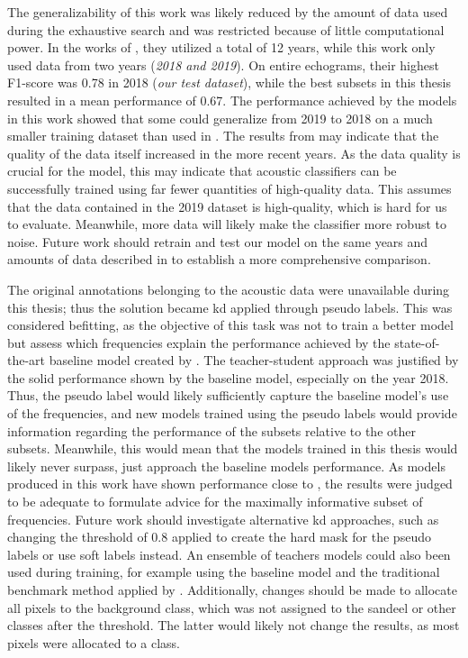     The generalizability of this work was likely reduced by the amount of data used during the exhaustive search and was restricted because of little computational power. In the works of \citeauthor{brautaset2020acoustic}, they utilized a total of 12 years, while this work only used data from two years (\textit{2018 and 2019}). On entire echograms, their highest F1-score was 0.78 in 2018 (\textit{our test dataset}), while the best subsets in this thesis resulted in a mean performance of 0.67. The performance achieved by the models in this work showed that some could generalize from 2019 to 2018 on a much smaller training dataset than used in \citet{brautaset2020acoustic}. The results from \citeauthor{brautaset2020acoustic} may indicate that the quality of the data itself increased in the more recent years. As the data quality is crucial for the model, this may indicate that acoustic classifiers can be successfully trained using far fewer quantities of high-quality data. This assumes that the data contained in the 2019 dataset is high-quality, which is hard for us to evaluate. Meanwhile, more data will likely make the classifier more robust to noise. Future work should retrain and test our model on the same years and amounts of data described in \citeauthor{brautaset2020acoustic} to establish a more comprehensive comparison.  
    
    
    The original annotations belonging to the acoustic data were unavailable during this thesis; thus the solution became \gls{kd} applied through pseudo labels. This was considered befitting, as the objective of this task was not to train a better model but assess which frequencies explain the performance achieved by the state-of-the-art baseline model created by \citet{brautaset2020acoustic}. The teacher-student approach was justified by the solid performance shown by the baseline model, especially on the year 2018. Thus, the pseudo label would likely sufficiently capture the baseline model's use of the frequencies, and new models trained using the pseudo labels would provide information regarding the performance of the subsets relative to the other subsets. Meanwhile, this would mean that the models trained in this thesis would likely never surpass, just approach the baseline models performance. As models produced in this work have shown performance close to \citeauthor{brautaset2020acoustic}, the results were judged to be adequate to formulate advice for the maximally informative subset of frequencies. Future work should investigate alternative \gls{kd} approaches, such as changing the threshold of 0.8 applied to create the hard mask for the pseudo labels or use soft labels instead. An ensemble of teachers models could also been used during training, for example using the baseline model and the traditional benchmark method applied by \citeauthor{brautaset2020acoustic}. Additionally, changes should be made to allocate all pixels to the background class, which was not assigned to the sandeel or other classes after the threshold. The latter would likely not change the results, as most pixels were allocated to a class. 

